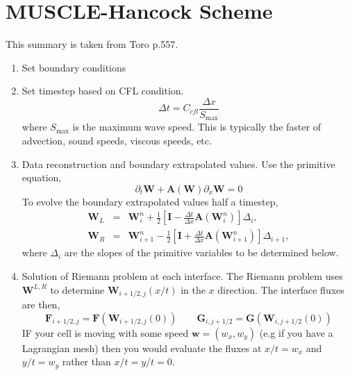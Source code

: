 \documentclass{article}
\begin{document}
\section{MUSCLE-Hancock Scheme}
This summary is taken from Toro p.557.
\begin{enumerate}
    \item Set boundary conditions
    \item Set timestep based on CFL condition.
        \begin{equation}
            \Delta t = C_{cfl} \frac{\Delta x}{S_\text{max}}
        \end{equation}
        where $S_\text{max}$ is the maximum wave speed. This is typically the faster of advection, sound speeds, viscous speeds, etc. 
    \item Data reconstruction and boundary extrapolated values.
        Use the primitive equation,
        \begin{equation}
            \partial_t \mathbf{W} + \mathbf{A}(\mathbf{W}) \partial_x \mathbf{W} = 0
        \end{equation}
        To evolve the boundary extrapolated values half a timestep, 
        \begin{eqnarray}
            \mathbf{W}_L &=& \mathbf{W}_i^n + \frac{1}{2} \left[ \mathbf{I} - \frac{\Delta t}{\Delta x} \mathbf{A}(\mathbf{W}_i^n) \right] \Delta _i , \\
            \mathbf{W}_R &=& \mathbf{W}_{i+1}^n - \frac{1}{2} \left[ \mathbf{I} + \frac{\Delta t}{\Delta x} \mathbf{A}(\mathbf{W}_{i+1}^n) \right] \Delta _{i+1} ,
        \end{eqnarray}
        where $\Delta_i$ are the slopes of the primitive variables to be determined below. 
    \item Solution of Riemann problem at each interface. 
        The Riemann problem uses $\mathbf{W}^{L,R}$ to determine $\mathbf{W}_{i+1/2,j}(x/t)$ in the $x$ direction. The interface fluxes are then,
        \begin{equation}
            \mathbf{F}_{i+1/2,j} = \mathbf{F}\left(\mathbf{W}_{i+1/2,j} (0) \right)
            \qquad 
            \mathbf{G}_{i,j+1/2} = \mathbf{G}\left(\mathbf{W}_{i,j+1/2} (0) \right)
        \end{equation}
        IF your cell is moving with some speed $\mathbf{w} = (w_x, w_y)$ (e.g if you have a Lagrangian mesh) then you would evaluate the fluxes at $x/t = w_x$ and $y/t = w_y$ rather than $x/t  = y/t = 0$.
\end{enumerate}
\end{document}
